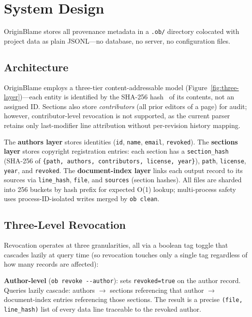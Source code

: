 \section{System Design}

OriginBlame stores all provenance metadata in a \texttt{.ob/} directory colocated with project data as plain JSONL---no database, no server, no configuration files.

\subsection{Architecture}

OriginBlame employs a three-tier content-addressable model (Figure~\ref{fig:three-layer})---each entity is identified by the SHA-256 hash~\cite{nist2015fips1804} of its contents, not an assigned ID. Sections also store \emph{contributors} (all prior editors of a page) for audit; however, contributor-level revocation is not supported, as the current parser retains only last-modifier line attribution without per-revision history mapping.

The \textbf{authors layer} stores identities (\texttt{id}, \texttt{name}, \texttt{email}, \texttt{revoked}). The \textbf{sections layer} stores copyright registration entries: each section has a \texttt{section\_hash} (SHA-256 of \texttt{\{path, authors, contributors, license, year\}}), \texttt{path}, \texttt{license}, \texttt{year}, and \texttt{revoked}. The \textbf{document-index layer} links each output record to its sources via \texttt{line\_hash}, \texttt{file}, and \texttt{sources} (section hashes). All files are sharded into 256 buckets by hash prefix for expected O(1) lookup; multi-process safety uses process-ID-isolated writes merged by \texttt{ob clean}.

\subsection{Three-Level Revocation}

Revocation operates at three granularities, all via a boolean tag toggle that cascades lazily at query time (so revocation touches only a single tag regardless of how many records are affected):

\noindent\textbf{Author-level} (\texttt{ob revoke -{}-author}): sets \texttt{revoked=true} on the author record. Queries lazily cascade: authors $\rightarrow$ sections referencing that author $\rightarrow$ document-index entries referencing those sections. The result is a precise \texttt{(file, line\_hash)} list of every data line traceable to the revoked author.

